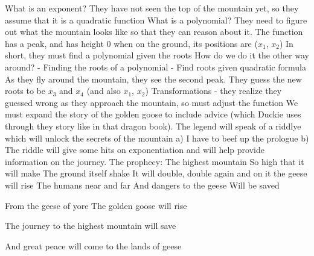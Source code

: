 What is an exponent?\linebreak
They have not seen the top of the mountain yet, so they assume that it is a quadratic function\linebreak
What is a polynomial? They need to figure out what the mountain looks like so that they can reason about it. The function has a peak, and has height 0 when on the ground, its positions are ($x_1$, $x_2$)\linebreak
\indent In short, they must find a polynomial given the roots \linebreak
How do we do it the other way around? - Finding the roots of a polynomial - Find roots given quadratic formula\linebreak
As they fly around the mountain, they see the second peak. They guess the new roots to be $x_3$ and $x_4$ (and also $x_1$, $x_2$)\linebreak
Transformations - they realize they guessed wrong as they approach the mountain, so must adjust the function\linebreak
We must expand the story of the golden goose to include advice (which Duckie uses through they story like in that dragon book). The legend will speak of a riddlye which will unlock the secrets of the mountain a)  I have to beef up the prologue b) The riddle will give some hits on exponentiation and will help provide information on the journey.
\vfill
\pagebreak
The prophecy:\linebreak
\linebreak
The highest mountain \linebreak
So high that it will make\linebreak 
The ground itself shake\linebreak
It will double, double again\linebreak
and on it the geese will rise\linebreak
The humans near and far\linebreak
And dangers to the geese\linebreak
Will be saved\linebreak

From the geese of yore\linebreak
The golden goose will rise\linebreak

The journey to the highest mountain\linebreak
will save \linebreak

And great peace will come to the lands of geese\linebreak
\vfill
\pagebreak
